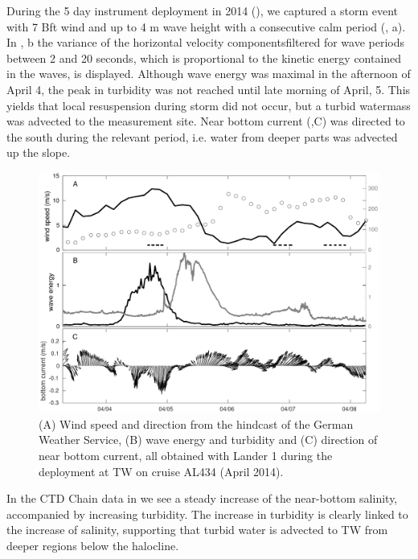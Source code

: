 During the 5 day instrument deployment in 2014 (), we captured 
a storm event with 7 Bft wind and up to 4 m wave height with a consecutive calm 
period (, a). In , b the variance of the 
horizontal velocity componentsfiltered for wave periods between 2 and 20 
seconds, which is proportional to the kinetic energy contained in the 
waves, is displayed. Although wave energy was maximal in the afternoon of April 
4, the peak in turbidity was not reached until late morning of April, 5. This 
yields that local resuspension during storm did not occur, but a turbid 
watermass was advected to the measurement site. Near bottom current 
(,C) was directed to the south during the relevant period, i.e. 
water from deeper parts was advected up the slope.
 \begin{figure}[ht]
\includegraphics[width=15cm]{bilder/al434tw.pdf}
 \caption{(A) Wind speed and direction from the hindcast of the German Weather 
Service, (B) wave energy and turbidity and (C) direction of 
near bottom current, all obtained with Lander 1 during the deployment at TW on 
cruise AL434 (April 2014).}
 \label{tromperwiek}
 \end{figure}

In the CTD Chain data in  we see a steady increase of the 
near-bottom salinity, accompanied by increasing turbidity. The increase in 
turbidity is clearly linked to the increase of salinity, supporting that turbid 
water is advected to TW from deeper regions below the halocline.

